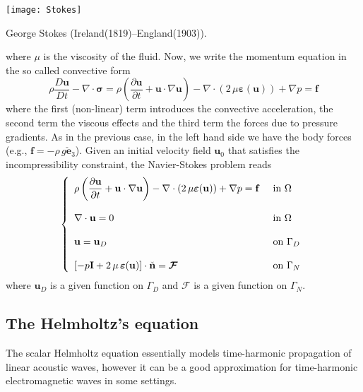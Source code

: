 \begin{marginfigure}[3.0cm]
	\texttt{[image: Stokes]}
	\caption[]{George Stokes (Ireland(1819)--England(1903)).} 
\end{marginfigure}
where $\mu$ is the viscosity of the fluid. Now, we write the momentum equation in the so called convective form
\begin{equation}
\rho\dfrac{D{\mathbf{u}}}{Dt} - \nabla \cdot\boldsymbol{\sigma} =  
\rho\left (\dfrac{\partial{\mathbf{u}}}{\partial{t}} +  \mathbf{u} \cdot \nabla \mathbf{u}\right ) 
- \nabla \cdot ( 2 \, \mu \boldsymbol{\varepsilon}(\mathbf{u})) + \nabla{p} = \mathbf{f}
\end{equation}
where the first (non-linear) term introduces the convective acceleration, the second term
the viscous effects and the third term the forces due to pressure gradients. As in the previous
case, in the left hand side we have the body forces (e.g., $\mathbf{f} = -\rho \, g  \check{\mathbf{e}}_3$).
Given an initial velocity field $\mathbf{u}_0$ that satisfies the incompressibility constraint,
the Navier-Stokes problem reads
\begin{equation}
\labeq{navierstokes}
\left\{
\begin{array}{ll}
\rho\left (\dfrac{\partial{\mathbf{u}}}{\partial{t}} +  \mathbf{u} \cdot \nabla \mathbf{u}\right )
- \nabla \cdot ( 2 \, \mu \boldsymbol{\varepsilon}(\mathbf{u})) + \nabla{p} = \mathbf{f} & \mbox{ in } \Omega \\
& \\
\nabla \cdot \mathbf{u} = 0  & \mbox{ in } \Omega \\
& \\
\mathbf{u} = \mathbf{u}_D & \mbox{ on } \Gamma_D \\
& \\
\left [-p\mathbf{I} + 2\,\mu\, \boldsymbol{\varepsilon}(\mathbf{u}) \right ] \cdot \check{\mathbf{n}} = \boldsymbol{\mathcal{F}} & \mbox{ on } \Gamma_N
\end{array}
\right.
\end{equation}
where $\mathbf{u}_D$ is a given function on $\Gamma_D$ and $\boldsymbol{\mathcal{F}}$ is
a given function on $\Gamma_N$.


\subsection{The Helmholtz's equation}
The scalar Helmholtz equation essentially models time-harmonic propagation of linear acoustic waves, 
however it can be a good approximation for time-harmonic electromagnetic waves in some settings. 

